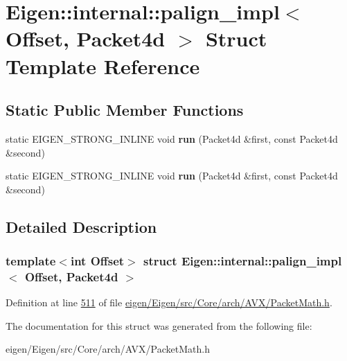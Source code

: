 \hypertarget{struct_eigen_1_1internal_1_1palign__impl_3_01_offset_00_01_packet4d_01_4}{}\section{Eigen\+:\+:internal\+:\+:palign\+\_\+impl$<$ Offset, Packet4d $>$ Struct Template Reference}
\label{struct_eigen_1_1internal_1_1palign__impl_3_01_offset_00_01_packet4d_01_4}
\subsection*{Static Public Member Functions}
\begin{DoxyCompactItemize}
\item 
\mbox{\label{struct_eigen_1_1internal_1_1palign__impl_3_01_offset_00_01_packet4d_01_4_a3e257fc150f0bd96ef4d8578bd6fbf64}} 
static E\+I\+G\+E\+N\+\_\+\+S\+T\+R\+O\+N\+G\+\_\+\+I\+N\+L\+I\+NE void {\bfseries run} (Packet4d \&first, const Packet4d \&second)
\item 
\mbox{\label{struct_eigen_1_1internal_1_1palign__impl_3_01_offset_00_01_packet4d_01_4_a3e257fc150f0bd96ef4d8578bd6fbf64}} 
static E\+I\+G\+E\+N\+\_\+\+S\+T\+R\+O\+N\+G\+\_\+\+I\+N\+L\+I\+NE void {\bfseries run} (Packet4d \&first, const Packet4d \&second)
\end{DoxyCompactItemize}


\subsection{Detailed Description}
\subsubsection*{template$<$int Offset$>$\newline
struct Eigen\+::internal\+::palign\+\_\+impl$<$ Offset, Packet4d $>$}



Definition at line \hyperlink{eigen_2_eigen_2src_2_core_2arch_2_a_v_x_2_packet_math_8h_source_l00511}{511} of file \hyperlink{eigen_2_eigen_2src_2_core_2arch_2_a_v_x_2_packet_math_8h_source}{eigen/\+Eigen/src/\+Core/arch/\+A\+V\+X/\+Packet\+Math.\+h}.



The documentation for this struct was generated from the following file\+:\begin{DoxyCompactItemize}
\item 
eigen/\+Eigen/src/\+Core/arch/\+A\+V\+X/\+Packet\+Math.\+h\end{DoxyCompactItemize}
